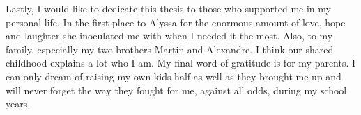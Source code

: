 Lastly, I would like to dedicate this thesis to those who supported me in my personal life.
In the first place to Alyssa for the enormous amount of love, hope and laughter she inoculated me with when I needed it the most.
Also, to my family, especially my two brothers Martin and Alexandre.
I think our shared childhood explains a lot who I am.
My final word of gratitude is for my parents.
I can only dream of raising my own kids half as well as they brought me up and will never forget the way they fought for me, against all odds, during my school years.


\newpage

\tableofcontents
\listoffigures
\printacronyms[nonumberlist]
\newpage